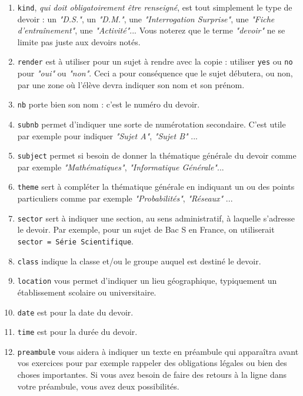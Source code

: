 \documentclass[12pt,a4paper]{article}
\theoremstyle{definition}
\begin{document}
\begin{enumerate}
	\item \verb+kind+, \emph{qui doit obligatoirement être renseigné}, est tout simplement le type de devoir : un \emph{"D.S."}, un \emph{"D.M."}, une \emph{"Interrogation Surprise"}, une \emph{"Fiche d'entraînement"}, une \emph{"Activité"}... 
	Vous noterez que le terme \emph{"devoir"} ne se limite pas juste aux devoirs notés.

	\item \verb+render+ est à utiliser pour un sujet à rendre avec la copie : utiliser \verb+yes+ ou \verb+no+ pour \emph{"oui"} ou \emph{"non"}.
	Ceci a pour conséquence que le sujet débutera, ou non, par une zone où l'élève devra indiquer son nom et son prénom.

	\item \verb+nb+ porte bien son nom : c'est le numéro du devoir.

	\item \verb+subnb+ permet d'indiquer une sorte de numérotation secondaire. C'est utile par exemple pour indiquer \emph{"Sujet A"}, \emph{"Sujet B"} ...

	\item \verb+subject+ permet si besoin de donner la thématique générale du devoir comme par exemple \emph{"Mathématiques"}, \emph{"Informatique Générale"}...

	\item \verb+theme+ sert à compléter la thématique générale en indiquant un ou des points particuliers comme par exemple \emph{"Probabilités"}, \emph{"Réseaux"} ...

	\item \verb+sector+ sert à indiquer une section, au sens administratif, à laquelle s'adresse le devoir. Par exemple, pour un sujet de Bac S en France, on utiliserait \verb+sector = Série Scientifique+. 

	\item \verb+class+ indique la classe et/ou le groupe auquel est destiné le devoir.

	\item \verb+location+ vous permet d'indiquer un lieu géographique, typiquement un établissement scolaire ou universitaire.

	\item \verb+date+ est pour la date du devoir.

	\item \verb+time+ est pour la durée du devoir.

	\item \verb+preambule+ vous aidera à indiquer un texte en préambule qui apparaîtra avant vos exercices pour par exemple rappeler des obligations légales ou bien des choses importantes.
	 Si vous avez besoin de faire des retours à la ligne dans votre préambule, vous avez deux possibilités.
	 

\end{enumerate}
\end{document}
